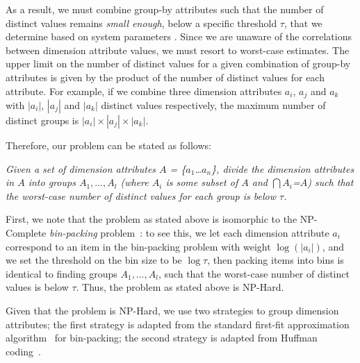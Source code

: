 As a result, we must combine group-by attributes such that the number of
distinct values remains {\it small enough}, below a specific 
threshold $\tau$, that we determine based on system parameters .
Since we are unaware of the correlations between dimension attribute values,
we must resort to worst-case estimates. 
The upper limit on the number of distinct values for a given combination of
group-by attributes is given by the product of the number of distinct values
for each attribute.
For example, if we combine three dimension attributes $a_i$, $a_j$ and $a_k$
with $|a_i|$, $|a_j|$ and $|a_k|$ distinct values respectively, the maximum number of
distinct groups is $|a_i|\times |a_j| \times |a_k|$.
  
Therefore, our problem can be stated as follows:
\begin{problem}
{\em Given a set of dimension attributes $A$ = \{$a_1$\ldots$a_n$\}, divide the
dimension attributes in $A$ into groups $A_1, \ldots, A_l$ (where $A_i$ is some
subset of $A$ and $\bigcap A_i$=$A$) such that the worst-case number of distinct values
for each group is below $\tau$.}
\end{problem}
First, we note that the problem as stated above is isomorphic to the NP-Complete
{\em bin-packing} problem~\cite{garey}: to see this, we let each dimension attribute
$a_i$ correspond to an item in the bin-packing problem with weight $\log (|a_i|)$,
and we set the threshold on the bin size to be $\log \tau$,
then packing items into bins is identical to finding groups $A_1, \ldots, A_l$,
such that the worst-case number of distinct values is below $\tau$.
Thus, the problem as stated above is NP-Hard.

Given that the problem is NP-Hard, we use two strategies to group dimension attributes;
the first strategy is adapted from the standard first-fit approximation algorithm~\cite{first-fit}
for bin-packing; the second strategy is adapted from Huffman coding~\cite{huffman-codes}.
  

